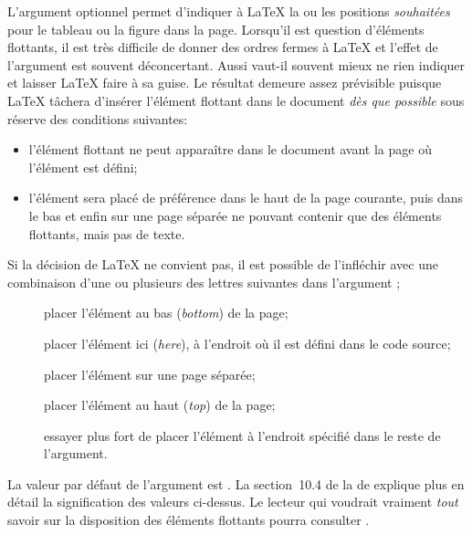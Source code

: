 L'argument optionnel  permet d'indiquer à {\LaTeX}
la ou les positions \emph{souhaitées} pour le tableau ou la figure dans la page.
Lorsqu'il est question d'éléments flottants, il est très difficile de donner des
ordres fermes à {\LaTeX} et l'effet de l'argument  est
souvent déconcertant. Aussi vaut-il souvent mieux ne rien indiquer et
laisser {\LaTeX} faire à sa guise. Le résultat demeure assez
prévisible puisque {\LaTeX} tâchera d'insérer l'élément flottant dans
le document \emph{dès que possible} sous réserve des conditions
suivantes:
\begin{itemize}
\item l'élément flottant ne peut apparaître dans le document avant la
  page où l'élément est défini;
\item l'élément sera placé de préférence dans le haut de la page
  courante, puis dans le bas et enfin sur une page séparée ne pouvant
  contenir que des éléments flottants, mais pas de texte.
\end{itemize}

Si la décision de {\LaTeX} ne convient pas, il est possible de
l'infléchir avec une combinaison d'une ou plusieurs des lettres
suivantes dans l'argument ;
\begin{description}
\item[\normalfont{}] placer l'élément au bas (\emph{bottom}) de la page;
\item[\normalfont{}] placer l'élément ici (\emph{here}), à
  l'endroit où il est défini dans le code source;
\item[\normalfont{}] placer l'élément sur une page séparée;
\item[\normalfont{}] placer l'élément au haut (\emph{top}) de la page;
\item[\normalfont\code{!}] essayer plus fort de placer l'élément à
  l'endroit spécifié dans le reste de l'argument.
\end{description}
La valeur par défaut de l'argument  est . La
section~10.4 de la %
de  explique plus en détail la signification des valeurs
ci-dessus. Le lecteur qui voudrait vraiment \emph{tout} savoir sur la
disposition des éléments flottants pourra consulter
\cite{Mittelbach:floats:2014}.

